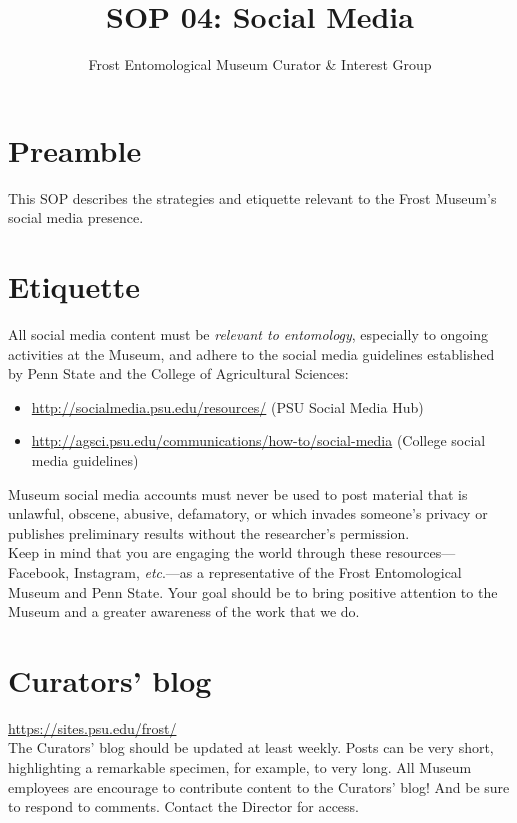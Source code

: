 \documentclass[letterpaper, 11pt]{article}
\title{SOP 04: Social Media}
\author{Frost Entomological Museum Curator \& Interest Group}
\begin{document}
\cleanlookdateon %
\maketitle
\thispagestyle{fancy}

\section*{Preamble}
This SOP describes the strategies and etiquette relevant to the Frost Museum's social media presence.

\section{Etiquette}
All social media content must be \textit{relevant to entomology}, especially to ongoing activities at the Museum, and adhere to the social media guidelines established by Penn State and the College of Agricultural Sciences:
\begin{itemize}
\item \url{http://socialmedia.psu.edu/resources/} (PSU Social Media Hub)
\item \url{http://agsci.psu.edu/communications/how-to/social-media} (College social media guidelines)
\end{itemize}
Museum social media accounts must never be used to post material that is unlawful, obscene, abusive, defamatory, or which invades someone's privacy or publishes preliminary results without the researcher's permission. \\

\noindent{}Keep in mind that you are engaging the world through these resources---Facebook, Instagram, \textit{etc}.---as a representative of the Frost Entomological Museum and Penn State. Your goal should be to bring positive attention to the Museum and a greater awareness of the work that we do.

\section{Curators' blog}
\url{https://sites.psu.edu/frost/} \\

\noindent{}The Curators' blog should be updated at least weekly. Posts can be very short, highlighting a remarkable specimen, for example, to very long. All Museum employees are encourage to contribute content to the Curators' blog! And be sure to respond to comments. Contact the Director for access.
\end{document}
